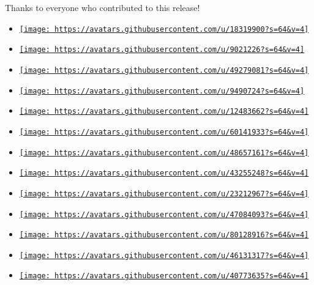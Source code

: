 Thanks to everyone who contributed to this release!

\begin{itemize}
\tightlist
\item
  \href{https://github.com/Leedehai}{\texttt{[image: https://avatars.githubusercontent.com/u/18319900?s=64\&v=4]}}
\item
  \href{https://github.com/PgBiel}{\texttt{[image: https://avatars.githubusercontent.com/u/9021226?s=64\&v=4]}}
\item
  \href{https://github.com/Marmare314}{\texttt{[image: https://avatars.githubusercontent.com/u/49279081?s=64\&v=4]}}
\item
  \href{https://github.com/SUPERCILEX}{\texttt{[image: https://avatars.githubusercontent.com/u/9490724?s=64\&v=4]}}
\item
  \href{https://github.com/peng1999}{\texttt{[image: https://avatars.githubusercontent.com/u/12483662?s=64\&v=4]}}
\item
  \href{https://github.com/sitandr}{\texttt{[image: https://avatars.githubusercontent.com/u/60141933?s=64\&v=4]}}
\item
  \href{https://github.com/stevenskevin}{\texttt{[image: https://avatars.githubusercontent.com/u/48657161?s=64\&v=4]}}
\item
  \href{https://github.com/AlistairKeiller}{\texttt{[image: https://avatars.githubusercontent.com/u/43255248?s=64\&v=4]}}
\item
  \href{https://github.com/HarmoGlace}{\texttt{[image: https://avatars.githubusercontent.com/u/23212967?s=64\&v=4]}}
\item
  \href{https://github.com/LaurenzV}{\texttt{[image: https://avatars.githubusercontent.com/u/47084093?s=64\&v=4]}}
\item
  \href{https://github.com/MultisampledNight}{\texttt{[image: https://avatars.githubusercontent.com/u/80128916?s=64\&v=4]}}
\item
  \href{https://github.com/albertothedev}{\texttt{[image: https://avatars.githubusercontent.com/u/46131317?s=64\&v=4]}}
\item
  \href{https://github.com/dvdvgt}{\texttt{[image: https://avatars.githubusercontent.com/u/40773635?s=64\&v=4]}}

\end{itemize}
